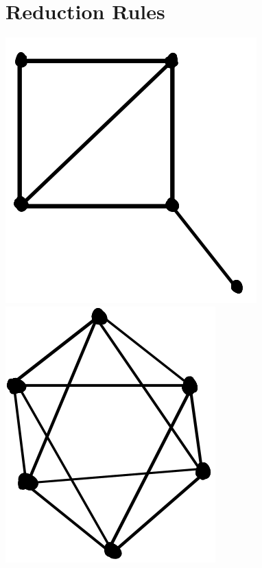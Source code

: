 \documentclass[12pt]{article}
\begin{document}

\newpage
\section*{Reduction Rules}

    \begin{center} \includegraphics{fig15.png} \hspace{3in} \includegraphics{fig17.png} \end{center}
\end{document}
